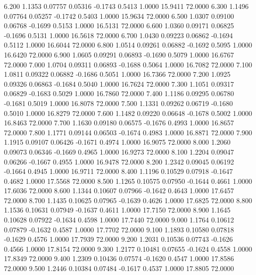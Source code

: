    6.200   1.1353   0.07757   0.05316  -0.1743   0.5413   1.0000  15.9411  72.0000
   6.300   1.1496   0.07764   0.05257  -0.1742   0.5403   1.0000  15.9634  72.0000
   6.500   1.0307   0.09100   0.06768  -0.1699   0.5153   1.0000  16.5131  72.0000
   6.600   1.0360   0.09171   0.06825  -0.1696   0.5131   1.0000  16.5618  72.0000
   6.700   1.0430   0.09223   0.06862  -0.1694   0.5112   1.0000  16.6044  72.0000
   6.800   1.0514   0.09261   0.06882  -0.1692   0.5095   1.0000  16.6420  72.0000
   6.900   1.0605   0.09291   0.06893  -0.1690   0.5079   1.0000  16.6767  72.0000
   7.000   1.0704   0.09311   0.06893  -0.1688   0.5064   1.0000  16.7082  72.0000
   7.100   1.0811   0.09322   0.06882  -0.1686   0.5051   1.0000  16.7366  72.0000
   7.200   1.0925   0.09326   0.06863  -0.1684   0.5040   1.0000  16.7624  72.0000
   7.300   1.1051   0.09317   0.06829  -0.1683   0.5029   1.0000  16.7860  72.0000
   7.400   1.1186   0.09295   0.06780  -0.1681   0.5019   1.0000  16.8078  72.0000
   7.500   1.1331   0.09262   0.06719  -0.1680   0.5010   1.0000  16.8279  72.0000
   7.600   1.1482   0.09220   0.06648  -0.1678   0.5002   1.0000  16.8463  72.0000
   7.700   1.1630   0.09180   0.06575  -0.1676   0.4993   1.0000  16.8657  72.0000
   7.800   1.1771   0.09144   0.06503  -0.1674   0.4983   1.0000  16.8871  72.0000
   7.900   1.1915   0.09107   0.06426  -0.1671   0.4974   1.0000  16.9075  72.0000
   8.000   1.2060   0.09073   0.06346  -0.1669   0.4965   1.0000  16.9273  72.0000
   8.100   1.2204   0.09047   0.06266  -0.1667   0.4955   1.0000  16.9478  72.0000
   8.200   1.2342   0.09045   0.06192  -0.1664   0.4945   1.0000  16.9711  72.0000
   8.400   1.1196   0.10529   0.07918  -0.1647   0.4682   1.0000  17.5568  72.0000
   8.500   1.1265   0.10575   0.07950  -0.1644   0.4661   1.0000  17.6036  72.0000
   8.600   1.1344   0.10607   0.07966  -0.1642   0.4643   1.0000  17.6457  72.0000
   8.700   1.1435   0.10625   0.07965  -0.1639   0.4626   1.0000  17.6825  72.0000
   8.800   1.1536   0.10631   0.07949  -0.1637   0.4611   1.0000  17.7150  72.0000
   8.900   1.1645   0.10628   0.07922  -0.1634   0.4598   1.0000  17.7440  72.0000
   9.000   1.1764   0.10612   0.07879  -0.1632   0.4587   1.0000  17.7702  72.0000
   9.100   1.1893   0.10580   0.07818  -0.1629   0.4576   1.0000  17.7939  72.0000
   9.200   1.2031   0.10536   0.07743  -0.1626   0.4566   1.0000  17.8154  72.0000
   9.300   1.2177   0.10481   0.07655  -0.1624   0.4558   1.0000  17.8349  72.0000
   9.400   1.2309   0.10436   0.07574  -0.1620   0.4547   1.0000  17.8586  72.0000
   9.500   1.2446   0.10384   0.07484  -0.1617   0.4537   1.0000  17.8805  72.0000

